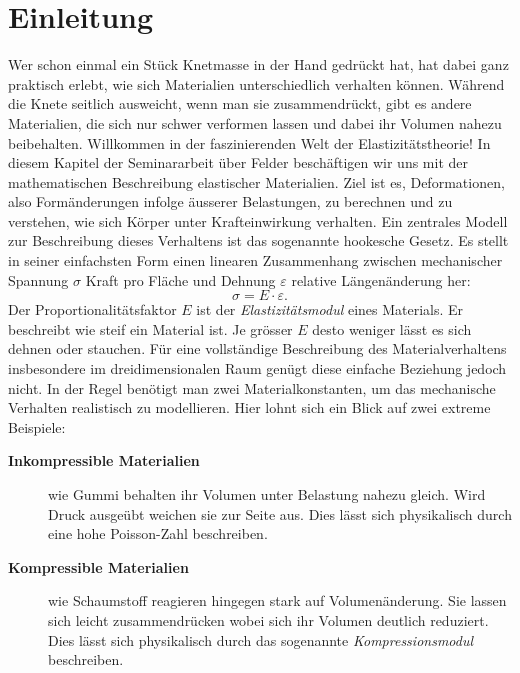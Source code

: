 %
%
%
%
\section{Einleitung}
\label{elastomechanik:section:Einleitung}
Wer schon einmal ein Stück Knetmasse in der Hand gedrückt hat, hat
dabei ganz praktisch erlebt, wie sich Materialien unterschiedlich
verhalten können.
Während die Knete seitlich ausweicht, wenn man sie zusammendrückt,
%
gibt es andere Materialien, die sich nur schwer verformen lassen und
dabei ihr Volumen nahezu beibehalten.
Willkommen in der faszinierenden Welt der Elastizitätstheorie!
In diesem Kapitel der Seminararbeit über Felder beschäftigen wir
uns mit der mathematischen Beschreibung elastischer Materialien.
%
Ziel ist es, Deformationen, also Formänderungen infolge äusserer
Belastungen, zu berechnen und zu verstehen, wie sich Körper unter
Krafteinwirkung verhalten.
%
Ein zentrales Modell zur Beschreibung dieses Verhaltens ist das sogenannte
hookesche Gesetz.
%
%
Es stellt in seiner einfachsten Form einen linearen Zusammenhang
zwischen mechanischer Spannung $\sigma$ Kraft pro Fläche und Dehnung
$\varepsilon$ relative Längenänderung her:
	\begin{equation*}
		\sigma = 
		E \cdot \varepsilon.
	\end{equation*}
Der Proportionalitätsfaktor $E$ ist der \emph{Elastizitätsmodul}
eines Materials.
%
Er beschreibt wie steif ein Material ist.
Je grösser $E$ desto weniger lässt es sich dehnen oder stauchen.
Für eine vollständige Beschreibung des Materialverhaltens insbesondere
im dreidimensionalen Raum genügt diese einfache Beziehung jedoch
nicht.
In der Regel benötigt man zwei Materialkonstanten,
um das mechanische Verhalten realistisch zu modellieren.
Hier lohnt sich ein Blick auf zwei extreme Beispiele:
\begin{description}
\item[\textbf{Inkompressible Materialien}] wie Gummi behalten ihr
Volumen unter Belastung nahezu gleich.
%
Wird Druck ausgeübt weichen sie zur Seite aus.
Dies lässt sich physikalisch durch eine hohe Poisson-Zahl beschreiben.
%
\item[\textbf{Kompressible Materialien}] wie Schaumstoff reagieren
hingegen stark auf Volumenänderung.
%
Sie lassen sich leicht zusammendrücken wobei sich ihr Volumen
deutlich reduziert.
Dies lässt sich physikalisch durch das sogenannte \emph{Kompressionsmodul}
beschreiben.
%
\end{description}

